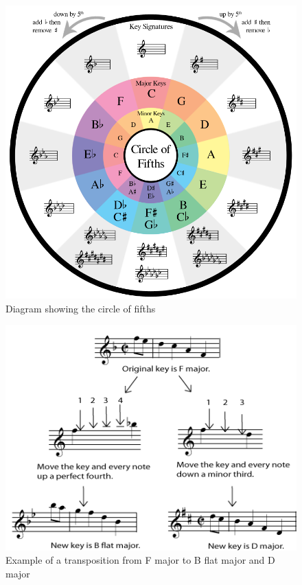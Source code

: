 \documentclass[12pt,]{article}
\begin{document}
\begin{figure}
\centering
\includegraphics[width=\textwidth,height=0.4\textheight]{Images/flypaperfifths.png}
\caption{Diagram showing the circle of fifths}
\end{figure}

\begin{figure}
\centering
\includegraphics[width=\textwidth,height=0.3\textheight]{Images/transp3b.png}
\caption{Example of a transposition from F major to B flat major and D
major}
\end{figure}
\end{document}
